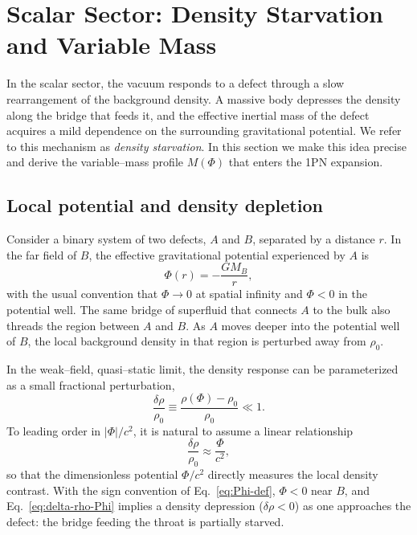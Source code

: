 \documentclass[11pt]{article}
\begin{document}
\section{Scalar Sector: Density Starvation and Variable Mass}
\label{sec:scalar_sector}

In the scalar sector, the vacuum responds to a defect through a slow
rearrangement of the background density.  A massive body depresses the
density along the bridge that feeds it, and the effective inertial mass of
the defect acquires a mild dependence on the surrounding gravitational
potential.  We refer to this mechanism as \emph{density starvation}.  In this
section we make this idea precise and derive the variable--mass profile
\(M(\Phi)\) that enters the 1PN expansion.

\subsection{Local potential and density depletion}
\label{subsec:scalar-density}

Consider a binary system of two defects, \(A\) and \(B\), separated by a
distance \(r\).  In the far field of \(B\), the effective gravitational
potential experienced by \(A\) is
\begin{equation}
  \Phi(r) = -\frac{G M_B}{r},
  \label{eq:Phi-def}
\end{equation}
with the usual convention that \(\Phi \to 0\) at spatial infinity and
\(\Phi < 0\) in the potential well.  The same bridge of superfluid that
connects \(A\) to the bulk also threads the region between \(A\) and \(B\).
As \(A\) moves deeper into the potential well of \(B\), the local background
density in that region is perturbed away from \(\rho_0\).

In the weak--field, quasi--static limit, the density response can be
parameterized as a small fractional perturbation,
\begin{equation}
  \frac{\delta \rho}{\rho_0}
  \equiv \frac{\rho(\Phi) - \rho_0}{\rho_0}
  \ll 1.
  \label{eq:delta-rho-def}
\end{equation}
To leading order in \(|\Phi|/c^2\), it is natural to assume a linear
relationship
\begin{equation}
  \frac{\delta \rho}{\rho_0}
  \approx \frac{\Phi}{c^2},
  \label{eq:delta-rho-Phi}
\end{equation}
so that the dimensionless potential \(\Phi/c^2\) directly measures the local
density contrast.  With the sign convention of Eq.~\eqref{eq:Phi-def},
\(\Phi<0\) near \(B\), and Eq.~\eqref{eq:delta-rho-Phi} implies a density
depression (\(\delta \rho < 0\)) as one approaches the defect: the bridge
feeding the throat is partially starved.
\end{document}
